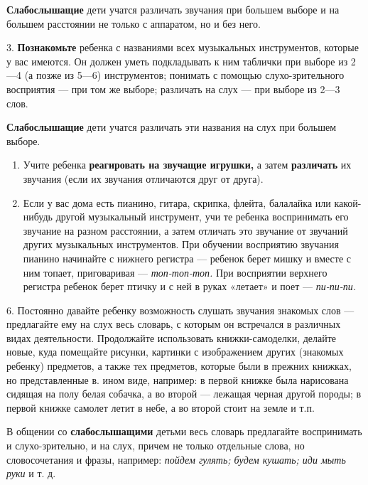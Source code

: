 \documentclass[a5paper]{book}
\renewcommand{\emph}[1]{\textit{#1}}
\begin{document}
\textbf{Слабослышащие} дети учатся различать звучания при большем выборе
и на большем расстоянии не только с аппаратом, но и без него.

3. \textbf{Познакомьте} ребенка с названиями всех музыкальных
инструментов, которые у вас имеются. Он должен уметь подкладывать к ним
таблички при выборе из 2---4 (а позже из 5---6) инструментов; понимать с
помощью слухо-зрительного восприятия --- при том же выборе; различать на
слух --- при выборе из 2---3 слов.

\textbf{Слабослышащие} дети учатся различать эти названия на слух при
большем выборе.


\begin{enumerate}
\def\labelenumi{\arabic{enumi}.}
\setcounter{enumi}{3}
\item
  
  Учите ребенка \textbf{реагировать на звучащие игрушки,} а затем
  \textbf{различать} их звучания (если их звучания отличаются друг от
  друга).
  
\item
  
  Если у вас дома есть пианино, гитара, скрипка, флейта, балалайка или
  какой-нибудь другой музыкальный инструмент, учи те ребенка
  воспринимать его звучание на разном расстоянии, а затем отличать это
  звучание от звучаний других музыкальных инструментов. При обучении
  восприятию звучания пианино начинайте с нижнего регистра --- ребенок
  берет мишку и вместе с ним топает, приговаривая ---
  \emph{топ-топ-топ.} При восприятии верхнего регистра ребенок берет
  птичку и с ней в руках «летает» и поет --- \emph{пи-пи-пи.}
  
\end{enumerate}


6. Постоянно давайте ребенку возможность слушать звучания знакомых слов
--- предлагайте ему на слух весь словарь, с которым он встречался в
различных видах деятельности. Продолжайте использовать книжки-самоделки,
делайте новые, куда помещайте рисунки, картинки с изображением других
(знакомых ребенку) предметов, а также тех предметов, которые были в
прежних книжках, но представленные в. ином виде, например: в первой
книжке была нарисована сидящая на полу белая собачка, а во второй ---
лежащая черная другой породы; в первой книжке самолет летит в небе, а во
второй стоит на земле и т.п.

В общении со \textbf{слабослышащими} детьми весь словарь предлагайте
воспринимать и слухо-зрительно, и на слух, причем не только отдельные
слова, но словосочетания и фразы, например: \emph{пойдем гулять; будем
кушать; иди мыть руки} и т. д.
\end{document}
